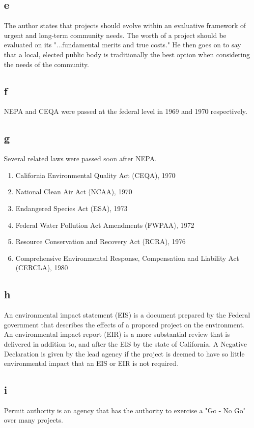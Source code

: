 \documentclass[12pt]{article} %
\begin{document}
	\subsection{e}
		The author states that projects should evolve within an evaluative framework of urgent and long-term community needs. The worth of a project should be evaluated on its "...fundamental merits and true costs." He then goes on to say that a local, elected public body is traditionally the best option when considering the needs of the community.
		
	\subsection{f}
		NEPA and CEQA were passed at the federal level in 1969 and 1970 respectively. 
	
	\subsection{g}
		Several related laws were passed soon after NEPA.
		\begin{enumerate}
			\item California Environmental Quality Act (CEQA), 1970
			\item National Clean Air Act (NCAA), 1970
			\item Endangered Species Act (ESA), 1973
			\item Federal Water Pollution Act Amendments (FWPAA), 1972
			\item Resource Conservation and Recovery Act (RCRA), 1976
			\item Comprehensive Environmental Response, Compensation and Liability Act (CERCLA), 1980
		\end{enumerate}			
	
	\subsection{h}
		An environmental impact statement (EIS) is a document prepared by the Federal government that describes the effects of a proposed project on the environment. An environmental impact report (EIR) is a more substantial review that is delivered in addition to, and after the EIS by the state of California. A Negative Declaration is given by the lead agency if the project is deemed to have so little environmental impact that an EIS or EIR is not required.
		
	\subsection{i}
		Permit authority is	an agency that has the authority to exercise a "Go - No Go" over many projects. 
	
\end{document}
